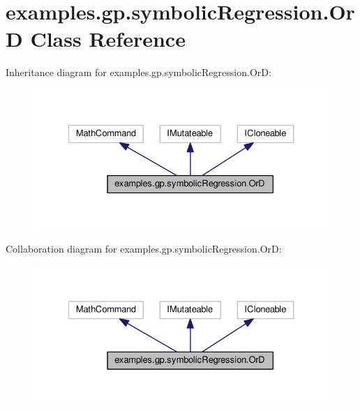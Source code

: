 \hypertarget{classexamples_1_1gp_1_1symbolic_regression_1_1_or_d}{\section{examples.\-gp.\-symbolic\-Regression.\-Or\-D Class Reference}
\label{classexamples_1_1gp_1_1symbolic_regression_1_1_or_d}
}


Inheritance diagram for examples.\-gp.\-symbolic\-Regression.\-Or\-D\-:
\nopagebreak
\begin{figure}[H]
\begin{center}
\leavevmode
\includegraphics[width=330pt]{classexamples_1_1gp_1_1symbolic_regression_1_1_or_d__inherit__graph}
\end{center}
\end{figure}


Collaboration diagram for examples.\-gp.\-symbolic\-Regression.\-Or\-D\-:
\nopagebreak
\begin{figure}[H]
\begin{center}
\leavevmode
\includegraphics[width=330pt]{classexamples_1_1gp_1_1symbolic_regression_1_1_or_d__coll__graph}
\end{center}
\end{figure}
